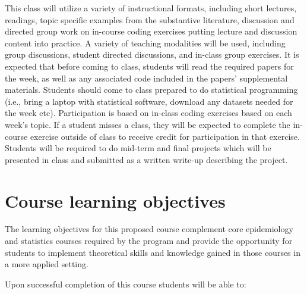 \documentclass[
]{book}
\begin{document}
This class will utilize a variety of instructional formats, including short lectures, readings, topic specific examples from the substantive literature, discussion and directed group work on in-course coding exercises putting lecture and discussion content into practice. A variety of teaching modalities will be used, including group discussions, student directed discussions, and in-class group exercises. It is expected that before coming to class, students will read the required papers for the week, as well as any associated code included in the papers' supplemental materials. Students should come to class prepared to do statistical programming (i.e., bring a laptop with statistical software, download any datasets needed for the week etc). Participation is based on in-class coding exercises based on each week's topic. If a student misses a class, they will be expected to complete the in-course exercise outside of class to receive credit for participation in that exercise. Students will be required to do mid-term and final projects which will be presented in class and submitted as a written write-up describing the project.

\hypertarget{course-learning-objectives}{%
\section{Course learning objectives}\label{course-learning-objectives}}

The learning objectives for this proposed course complement core epidemiology
and statistics courses required by the program and provide the opportunity for
students to implement theoretical skills and knowledge gained in those courses
in a more applied setting.

Upon successful completion of this course students will be able to:
\end{document}
